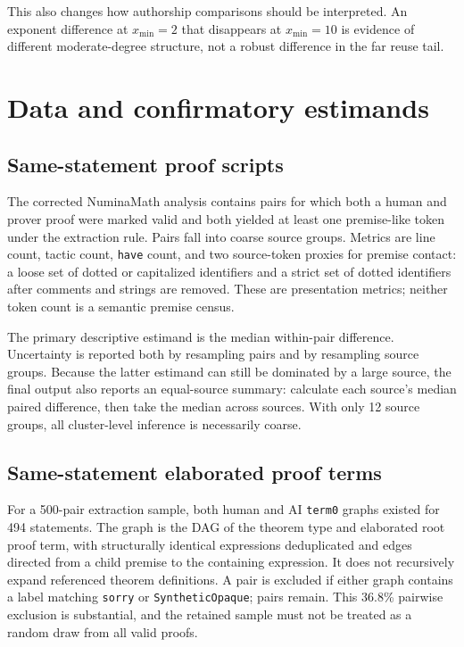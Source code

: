 \documentclass[11pt]{article}
\newcommand{\code}[1]{\texttt{#1}}
\newcommand{\xmin}{x_{\min}}
\begin{document}
This also changes how authorship comparisons should be interpreted.  An exponent difference at
$\xmin=2$ that disappears at $\xmin=10$ is evidence of different moderate-degree structure, not a
robust difference in the far reuse tail.

\section{Data and confirmatory estimands}

\subsection{Same-statement proof scripts}

The corrected NuminaMath analysis contains \SourceN{} pairs for which both a human and prover proof
were marked valid and both yielded at least one premise-like token under the extraction rule.
Pairs fall into \SourceClusters{} coarse source groups.  Metrics are line count, tactic count,
\code{have} count, and two source-token proxies for premise contact: a loose set of dotted or
capitalized identifiers and a strict set of dotted identifiers after comments and strings are
removed.  These are presentation metrics; neither token count is a semantic premise census.

The primary descriptive estimand is the median within-pair difference.  Uncertainty is reported
both by resampling pairs and by resampling source groups.  Because the latter estimand can still be
dominated by a large source, the final output also reports an equal-source summary: calculate each
source's median paired difference, then take the median across sources.  With only 12 source groups,
all cluster-level inference is necessarily coarse.

\subsection{Same-statement elaborated proof terms}

For a 500-pair extraction sample, both human and AI \code{term0} graphs existed for 494 statements.
The graph is the DAG of the theorem type and elaborated root proof term, with structurally identical
expressions deduplicated and edges directed from a child premise to the containing expression.  It
does not recursively expand referenced theorem definitions.  A pair is excluded if either graph
contains a label matching \code{sorry} or \code{SyntheticOpaque}; \TermN{} pairs remain.  This
36.8\% pairwise exclusion is substantial, and the retained sample must not be treated as a random
draw from all valid proofs.
\end{document}

